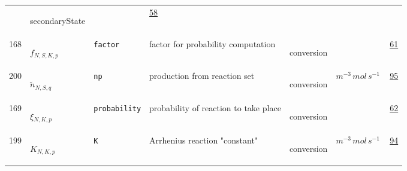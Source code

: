 \begin{longtable}{|p{1cm}|p{2.5cm}|p{4.5cm}|p{8cm}|p{3.0cm}|p{3cm}|p{1cm}|}
             & \begin{lay}secondaryState \end{lay}
             & $  $
             &                 \hyperlink{"e:58"}{ 58 }
                 \\
            168
             & \hypertarget{"v:168"}{ $ {f}{_{N, S, K, p}} $}
             & \verb|factor|
             & factor for probability computation
             & \begin{lay}conversion \end{lay}
             & $  $
             &                 \hyperlink{"e:61"}{ 61 }
                 \\
            200
             & \hypertarget{"v:200"}{ $ {{\tilde{n}}}{_{N, S, q}} $}
             & \verb|np|
             & production from reaction set
             & \begin{lay}conversion \end{lay}
             & $ m^{-3} \,mol \,s^{-1} \, $
             &                 \hyperlink{"e:95"}{ 95 }
                 \\
            169
             & \hypertarget{"v:169"}{ $ {\xi}{_{N, K, p}} $}
             & \verb|probability|
             & probability of reaction to take place
             & \begin{lay}conversion \end{lay}
             & $  $
             &                 \hyperlink{"e:62"}{ 62 }
                 \\
            199
             & \hypertarget{"v:199"}{ $ {K}{_{N, K, p}} $}
             & \verb|K|
             & Arrhenius reaction "constant"
             & \begin{lay}conversion \end{lay}
             & $ m^{-3} \,mol \,s^{-1} \, $
             &                 \hyperlink{"e:94"}{ 94 }
                 \\
    \end{longtable}